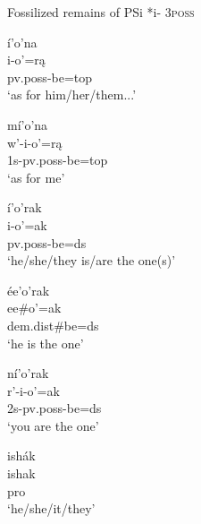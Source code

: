 \begin{exe}

\item\label{possessivearchaisms} Fossilized remains of PSi *i- \textsc{3poss}

	\begin{xlist}
	
	\item\label{possessivearchaisms1} \glll í'o'na\\
	i-o'=rą\\
	pv.poss-\textnormal{be}=top\\
	\glt `as for him/her/them...' \citep[88]{hollow1970}
	
	\item\label{possessivearchaisms2} \glll mí'o'na\\
	w'-i-o'=rą\\
	1s-pv.poss-\textnormal{be}=top\\
	\glt `as for me' \citep[244]{hollow1973b}
	
	\item\label{possessivearchaisms3} \glll í'o'rak\\
	i-o'=ak\\
	pv.poss-\textnormal{be}=ds\\
	\glt `he/she/they is/are the one(s)' \citep[88]{hollow1970}
	
	\item\label{possessivearchaisms7} \glll ée'o'rak\\
	ee\#o'=ak\\
	dem.dist\#\textnormal{be}=ds\\
	\glt `he is the one' \citep[212]{hollow1973a}
	
	\item\label{possessivearchaisms4} \glll ní'o'rak\\
	r'-i-o'=ak\\
	2s-pv.poss-\textnormal{be}=ds\\
	\glt `you are the one' \citep[105]{hollow1973a}
	
	\item\label{possessivearchaisms5} \glll ishák\\
	ishak\\
	\textnormal{pro}\\
	\glt `he/she/it/they' \citep[1]{hollow1973a}
	
	
	\end{xlist}

\end{exe}

